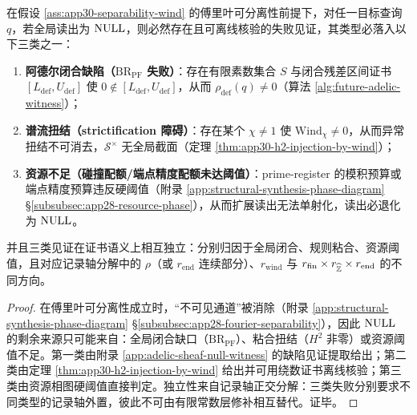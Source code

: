 \begin{theorem}\label{thm:app30-null-trichotomy}
在假设 \ref{ass:app30-separability-wind} 的傅里叶可分离性前提下，对任一目标查询 $q$，若全局读出为 $\mathrm{NULL}$，则必然存在且可离线核验的失败见证，其类型必落入以下三类之一：
\begin{enumerate}
  \item \textbf{阿德尔闭合缺陷（$\mathrm{BR}_{\mathrm{PF}}$ 失败）}：存在有限素数集合 $S$ 与闭合残差区间证书 $[L_{\mathrm{def}},U_{\mathrm{def}}]$ 使 $0\notin[L_{\mathrm{def}},U_{\mathrm{def}}]$，从而 $\rho_{\mathrm{def}}(q)\neq 0$（算法 \ref{alg:future-adelic-witness}）；
  \item \textbf{谱流扭结（strictification 障碍）}：存在某个 $\chi\neq 1$ 使 $\mathrm{Wind}_\chi\neq 0$，从而异常扭结不可消去，$\mathcal{S}^\times$ 无全局截面（定理 \ref{thm:app30-h2-injection-by-wind}）；
  \item \textbf{资源不足（碰撞配额/端点精度配额未达阈值）}：prime-register 的模积预算或端点精度预算违反硬阈值（附录 \ref{app:structural-synthesis-phase-diagram} \S\ref{subsubsec:app28-resource-phase}），从而扩展读出无法单射化，读出必退化为 $\mathrm{NULL}$。
\end{enumerate}
并且三类见证在证书语义上相互独立：分别归因于全局闭合、规则粘合、资源阈值，且对应记录轴分解中的 $\rho$（或 $r_{\mathrm{end}}$ 连续部分）、$r_{\mathrm{wind}}$ 与 $r_{\mathrm{fin}}\times r_{\widehat{\mathbb{Z}}}\times r_{\mathrm{end}}$ 的不同方向。
\end{theorem}

\begin{proof}
在傅里叶可分离性成立时，“不可见通道”被消除（附录 \ref{app:structural-synthesis-phase-diagram} \S\ref{subsubsec:app28-fourier-separability}），因此 $\mathrm{NULL}$ 的剩余来源只可能来自：全局闭合缺口（$\mathrm{BR}_{\mathrm{PF}}$）、粘合扭结（$H^2$ 非零）或资源阈值不足。第一类由附录 \ref{app:adelic-sheaf-null-witness} 的缺陷见证提取给出；第二类由定理 \ref{thm:app30-h2-injection-by-wind} 给出并可用绕数证书离线核验；第三类由资源相图硬阈值直接判定。独立性来自记录轴正交分解：三类失败分别要求不同类型的记录轴外置，彼此不可由有限常数层修补相互替代。证毕。
\end{proof}

